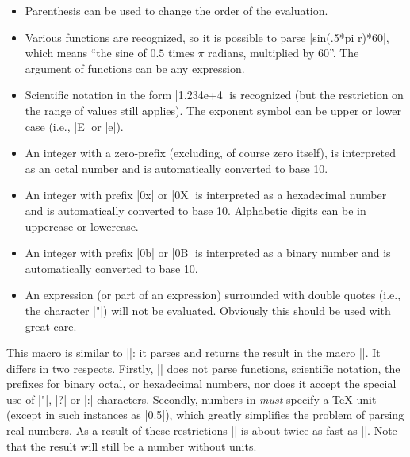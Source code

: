 \begin{command}{\pgfmathparse{}}
\begin{itemize}
  \item
    Parenthesis can be used to change the order of the evaluation.
    
  \item
    Various functions are recognized, so it is possible to parse
    |sin(.5*pi r)*60|, which means ``the sine of $0.5$ times $\pi$
    radians, multiplied by 60''. The argument of functions can
    be any expression.
    
  \item
    Scientific notation in the form |1.234e+4| is recognized (but
    the restriction on the range of values still applies). The exponent
    symbol can be upper or lower case (i.e., |E| or |e|).
    
  \item
    An integer with a zero-prefix (excluding, of course zero itself),
    is interpreted as an octal number and is automatically converted
    to base 10.
    
  \item
    An integer with prefix |0x| or |0X| is interpreted as a hexadecimal
    number and is automatically converted to base 10. Alphabetic digits
    can be in uppercase or lowercase.
    
  \item
    An integer with prefix |0b| or |0B| is interpreted as a binary
    number and is automatically converted to base 10.
    
  \item
    An expression (or part of an expression) surrounded with double
    quotes (i.e., the character |"|) will not be evaluated.
    Obviously this should be used with great care.
    
  \end{itemize}

\end{command}



\begin{command}{\pgfmathqparse{}}
  This macro is similar to |\pgfmathparse|: it parses
   and returns the result in the macro
  |\pgfmathresult|. It differs in two respects. Firstly,
  |\pgfmathqparse| does not parse functions, scientific
  notation, the prefixes for binary octal, or hexadecimal numbers,
  nor does it accept the special use of |"|, |?| or |:| characters.
  Secondly, numbers in  \emph{must}
  specify a \TeX{} unit (except in such instances as |0.5\pgf@x|),
  which greatly simplifies the problem of parsing real numbers.
  As a result of these restrictions |\pgfmathqparse|
  is about twice as fast as |\pgfmathparse|. Note that the result
  will still be a number without units.	
\end{command}

